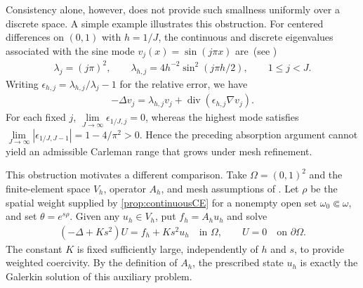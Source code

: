 \documentclass[print,wide,eng]{draft}
\begin{document}
Consistency alone, however, does not provide such smallness uniformly over a discrete space. A simple example illustrates this obstruction. For centered differences on $(0,1)$ with $h=1/J$, the continuous and discrete eigenvalues associated with the sine mode $v_j(x)=\sin(j\pi x)$ are~(see \cite[Section~4.2]{Zuazua2005})
\begin{align*}
\lambda_j=(j\pi)^2,\qquad
\lambda_{h,j}=4h^{-2}\sin^2(j\pi h/2),\qquad 1\leq j<J.
\end{align*}
Writing $\epsilon_{h,j}=\lambda_{h,j}/\lambda_j-1$ for the relative error, we have
\begin{align*}
-\Delta v_j=\lambda_{h,j}v_j+\operatorname{div}(\epsilon_{h,j}\nabla v_j).
\end{align*}
For each fixed $j$, $\lim\limits_{J\to\infty}\epsilon_{1/J,j}=0$, whereas the highest mode satisfies $\lim\limits_{J\to\infty}|\epsilon_{1/J,J-1}|=1-4/\pi^2>0$. Hence the preceding absorption argument cannot yield an admissible Carleman range that grows under mesh refinement.

This obstruction motivates a different comparison. Take $\Omega=(0,1)^2$ and the finite-element space $V_h$, operator $A_h$, and mesh assumptions of . Let $\rho$ be the spatial weight supplied by \cref{prop:continuousCE} for a nonempty open set $\omega_0\Subset\omega$, and set $\theta=e^{s\rho}$. Given any $u_h\in V_h$, put $f_h=A_hu_h$ and solve
\begin{align}\label{intro:poisson-auxiliary}
(-\Delta+Ks^2)U=f_h+Ks^2u_h\quad\text{in }\Omega,
\qquad U=0\quad\text{on }\partial\Omega.
\end{align}
The constant $K$ is fixed sufficiently large, independently of $h$ and $s$, to provide weighted coercivity. By the definition of $A_h$, the prescribed state $u_h$ is exactly the Galerkin solution of this auxiliary problem.
\end{document}
